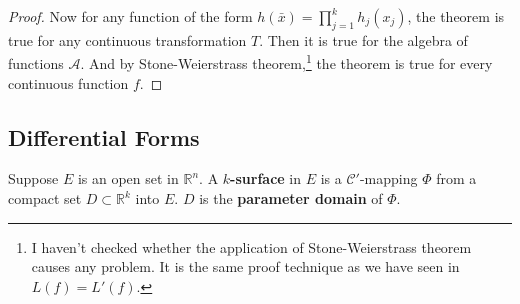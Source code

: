 \begin{proof}
	Now for any function of the form $h(\bar{x}) = \prod\limits_{j = 1}^k h_j(x_j)$, the theorem is true for any continuous transformation $T$.
	Then it is true for the algebra of functions $\mathscr{A}$.
	And by Stone-Weierstrass theorem,\footnote{I haven't checked whether the application of Stone-Weierstrass theorem causes any problem. It is the same proof technique as we have seen in $L(f) = L'(f)$.}
	the theorem is true for every continuous function $f$.
\end{proof}

\subsection{Differential Forms}
\begin{definition}
	Suppose $E$ is an open set in $\mathbb{R}^n$.
	A \textbf{$k$-surface} in $E$ is a $\mathscr{C}'$-mapping $\Phi$ from a compact set $D \subset \mathbb{R}^k$ into $E$.
	$D$ is the \textbf{parameter domain} of $\Phi$.
\end{definition}

